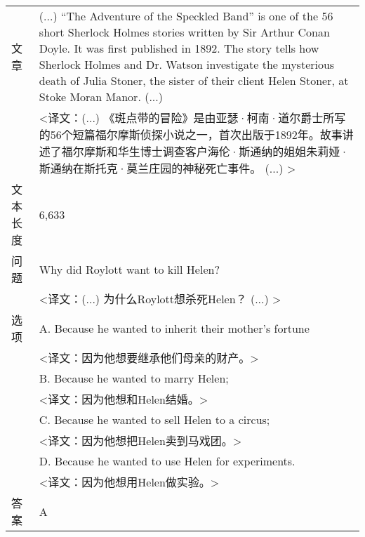 \begin{table}[htbp]
\begin{tabular}{p{48pt}|p{360pt}}
         \hline
         文章 & (...) ``The Adventure of the Speckled Band'' is one of the 56 short Sherlock Holmes stories written by Sir Arthur Conan Doyle. It was first published in 1892. The story tells how Sherlock Holmes and Dr. Watson investigate the mysterious death of Julia Stoner, the sister of their client Helen Stoner, at Stoke Moran Manor. (...) \\
          & <译文：(...) 《斑点带的冒险》是由亚瑟·柯南·道尔爵士所写的56个短篇福尔摩斯侦探小说之一，首次出版于1892年。故事讲述了福尔摩斯和华生博士调查客户海伦·斯通纳的姐姐朱莉娅·斯通纳在斯托克·莫兰庄园的神秘死亡事件。 (...) > \\
         \hline
         文本长度 & 6,633 \\
         \hline
         问题 & Why did Roylott want to kill Helen?  \\
          & <译文：(...) 为什么Roylott想杀死Helen？ (...) > \\
         \hline
         选项 & A. Because he wanted to inherit their mother’s fortune \\ 
         & <译文：因为他想要继承他们母亲的财产。> \\
          & B. Because he wanted to marry Helen; \\
          & <译文：因为他想和Helen结婚。> \\
          & C. Because he wanted to sell Helen to a circus; \\
          & <译文：因为他想把Helen卖到马戏团。> \\
          & D. Because he wanted to use Helen for experiments. \\
          & <译文：因为他想用Helen做实验。> \\
         \hline
         答案 & A \\
         \hline
    \end{tabular}
    \label{tab:2-1}
\end{table}
